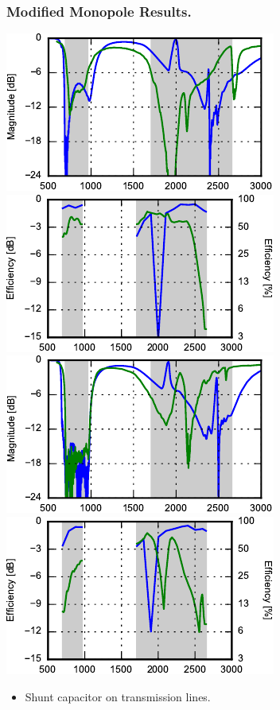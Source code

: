 \begin{frame}
  \frametitle{Modified Monopole Results.}
\begin{center}
    \includegraphics{img/Lasse/tuner_pcb/002_s11top.pdf}
    \includegraphics{img/Lasse/tuner_pcb/002_efftop.pdf} \\
    \includegraphics{img/Lasse/tuner_pcb/002_s22side.pdf}
    \includegraphics{img/Lasse/tuner_pcb/002_effside.pdf}
\end{center}
      \begin{itemize}
      \item Shunt capacitor on transmission lines.
      \end{itemize}
\legendfooter
\end{frame}
\def\legendfooter{\scriptsize{Upper: Top antenna. Lower: Side antenna. \textcolor{bb}{Monopole without cap}, \textcolor{gg}{Monopole with cap}, Frequency in MHz.}}
\def\emptyline{\textcolor{white}{Empty}}

